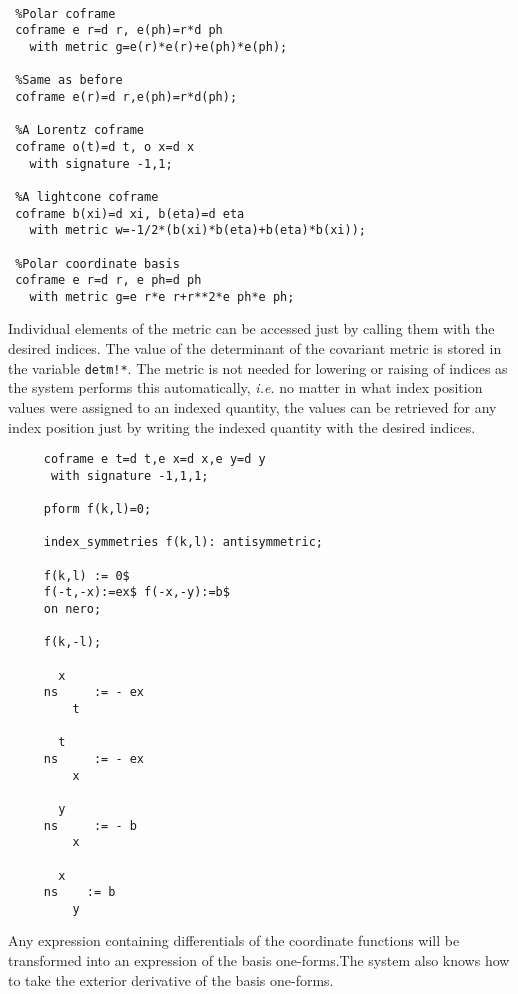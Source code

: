 \example{}

\begin{verbatim}

 %Polar coframe 
 coframe e r=d r, e(ph)=r*d ph
   with metric g=e(r)*e(r)+e(ph)*e(ph);

 %Same as before
 coframe e(r)=d r,e(ph)=r*d(ph);

 %A Lorentz coframe
 coframe o(t)=d t, o x=d x
   with signature -1,1;

 %A lightcone coframe
 coframe b(xi)=d xi, b(eta)=d eta
   with metric w=-1/2*(b(xi)*b(eta)+b(eta)*b(xi));

 %Polar coordinate basis
 coframe e r=d r, e ph=d ph
   with metric g=e r*e r+r**2*e ph*e ph;

\end{verbatim}

Individual elements of the metric can be accessed just by calling them
with the desired indices. The value of the determinant of the
 
covariant metric is stored in the variable \texttt{detm!*}.  The metric
is not needed for lowering or raising of indices as the system
performs this automatically, \emph{i.e.} no matter in what index
position values were assigned to an indexed quantity, the values can
be retrieved for any index position just by writing the indexed
quantity with the desired indices.

\example{}

\begin{verbatim}
     coframe e t=d t,e x=d x,e y=d y
      with signature -1,1,1;

     pform f(k,l)=0;

     index_symmetries f(k,l): antisymmetric;

     f(k,l) := 0$
     f(-t,-x):=ex$ f(-x,-y):=b$
     on nero;

     f(k,-l);

       x
     ns     := - ex
         t

       t
     ns     := - ex
         x

       y
     ns     := - b
         x

       x
     ns    := b
         y
\end{verbatim}

Any expression containing differentials of the coordinate functions will
be transformed into an expression of the basis one-forms.The system also
knows how to take the exterior derivative of the basis one-forms.

